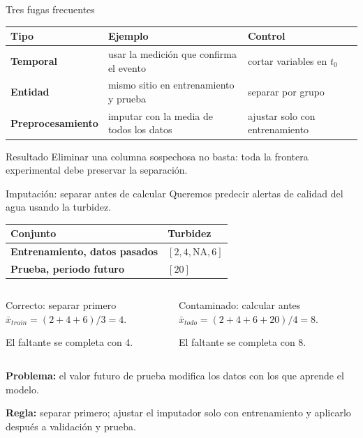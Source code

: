 \documentclass[aspectratio=169,10pt]{beamer}
\begin{document}
\begin{frame}{Tres fugas frecuentes}
  \footnotesize
  \begin{tabularx}{\textwidth}{>{\bfseries}p{} X X}
    \toprule Tipo & Ejemplo & Control \\ \midrule
    Temporal & usar la medición que confirma el evento & cortar variables en $t_0$ \\
    Entidad & mismo sitio en entrenamiento y prueba & separar por grupo \\
    Preprocesamiento & imputar con la media de todos los datos & ajustar solo con entrenamiento \\
    \bottomrule
  \end{tabularx}
  \begin{alertblock}{Resultado}
    Eliminar una columna sospechosa no basta: toda la frontera experimental debe preservar la separación.
  \end{alertblock}
\end{frame}

\begin{frame}{Imputación: separar antes de calcular}
  \footnotesize
  Queremos predecir alertas de calidad del agua usando la turbidez.

  \medskip
  \begin{tabularx}{\textwidth}{>{\bfseries}p{} X}
    \toprule Conjunto & Turbidez \\ \midrule
    Entrenamiento, datos pasados & $[2,4,\mathrm{NA},6]$ \\
    Prueba, periodo futuro & $[20]$ \\
    \bottomrule
  \end{tabularx}

  \medskip
  \begin{columns}[T,onlytextwidth]
    \begin{block}{Correcto: separar primero}
      $\bar x_{train}=(2+4+6)/3=4$.

      El faltante se completa con 4.
    \end{block}
    \begin{alertblock}{Contaminado: calcular antes}
      $\bar x_{todo}=(2+4+6+20)/4=8$.

      El faltante se completa con 8.
    \end{alertblock}
  \end{columns}

  \textbf{Problema:} el valor futuro de prueba modifica los datos con los que aprende el modelo.

  \textbf{Regla:} separar primero; ajustar el imputador solo con entrenamiento y aplicarlo después a validación y prueba.
\end{frame}
\end{document}
